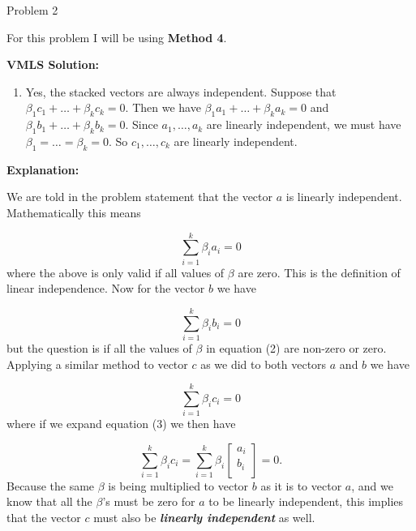 \begin{problem}{Problem 2}
    \begin{Highlight}
        For this problem I will be using \textbf{Method 4}. \vspace*{1em}

        \textbf{VMLS Solution:}

        \begin{enumerate}[label = (\alph*)]
            \item Yes, the stacked vectors are always independent. Suppose that $\beta_{1} c_{1} + \dots + \beta_{k} c_{k} = 0$. Then we have $\beta_{1}a_{1} + \dots + \beta_{k} a_{k} = 0$ and $\beta_{1} 
            b_{1} + \dots + \beta_{k} b_{k} = 0$. Since $a_{1} , \dots , a_{k}$ are linearly independent, we must have $\beta_{1} = \dots = \beta_{k} = 0$. So $c_{1}, \dots , c_{k}$ are linearly 
            independent.
        \end{enumerate}

        \textbf{Explanation:} \vspace*{1em}

        We are told in the problem statement that the vector $a$ is linearly independent. Mathematically this means

        \setcounter{equation}{0}
        \begin{equation}
            \sum_{i = 1}^{k} \beta_{i}a_{i} = 0
        \end{equation}
        where the above is only valid if all values of $\beta$ are zero. This is the definition of linear independence. Now for the vector $b$ we have

        \begin{equation}
            \sum_{i = 1}^{k} \beta_{i}b_{i} = 0
        \end{equation}
        but the question is if all the values of $\beta$ in equation (2) are non-zero or zero. Applying a similar method to vector $c$ as we did to both vectors $a$ and $b$ we have

        \begin{equation}
            \sum_{i = 1}^{k} \beta_{i}c_{i} = 0
        \end{equation}
        where if we expand equation (3) we then have 

        \begin{equation}
            \sum_{i = 1}^{k} \beta_{i}c_{i} = \sum_{i = 1}^{k} \beta_{i}
            \begin{bmatrix}
                a_{i} \\
                b_{i} \\
            \end{bmatrix}
            = 0.
        \end{equation}
        Because the same $\beta$ is being multiplied to vector $b$ as it is to vector $a$, and we know that all the $\beta$'s must be zero for $a$ to be linearly independent, this implies that the 
        vector $c$ must also be \textit{\textbf{linearly independent}} as well.
    \end{Highlight}


\end{problem}
